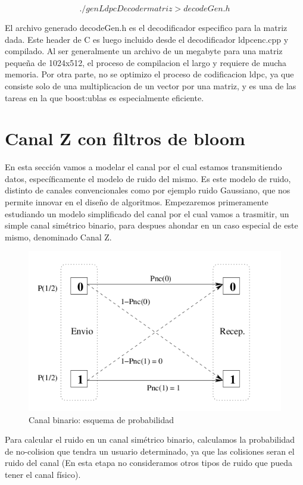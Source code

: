 $$ ./genLdpcDecoder matriz  > decodeGen.h $$

El archivo generado decodeGen.h es el decodificador especifico para la matriz dada. Este header de C es luego incluido desde el decodificador ldpcenc.cpp y compilado. Al ser generalmente un archivo de un megabyte para una matriz pequeña de 1024x512, el proceso de compilacion el largo y requiere de mucha memoria.
Por otra parte, no se optimizo el proceso de codificacion ldpc, ya que consiste solo de una multiplicacion de un vector por una matriz, y es una de las tareas en la que boost:ublas es especialmente eficiente.

\section{Canal Z con filtros de bloom}

En esta sección vamos a modelar el canal por el cual estamos transmitiendo datos, específicamente el modelo de ruido del mismo. Es este modelo de ruido, distinto de canales convencionales como por ejemplo ruido Gaussiano, que nos permite innovar en el diseño de algoritmos.
Empezaremos primeramente estudiando un modelo simplificado del canal por el cual vamos a trasmitir, un simple canal simétrico binario, para despues ahondar en un caso especial de este mismo, denominado Canal Z.
\begin{figure}[t]
  \begin{center}
    \includegraphics[scale=0.43]{capacidad/canalBinario.png}
  \end{center}
\caption {Canal binario: esquema de probabilidad}
\label{fig:canbin}
\end{figure}

Para calcular el ruido en un canal simétrico binario, calculamos la probabilidad de no-colision que tendra un usuario determinado, ya que las colisiones seran el ruido del canal (En esta etapa no consideramos otros tipos de ruido que pueda tener el canal físico).

